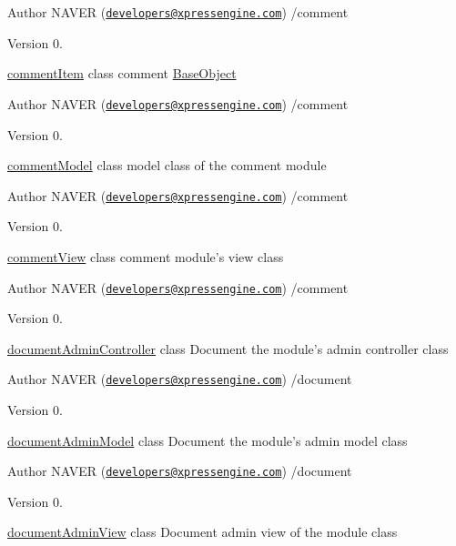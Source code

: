 \begin{DoxyAuthor}{Author}
N\-A\-V\-E\-R (\href{mailto:developers@xpressengine.com}{\tt developers@xpressengine.\-com}) /comment 
\end{DoxyAuthor}
\begin{DoxyVersion}{Version}
0.
\end{DoxyVersion}
\hyperlink{classcommentItem}{comment\-Item} class comment \hyperlink{classBaseObject}{Base\-Object}

\begin{DoxyAuthor}{Author}
N\-A\-V\-E\-R (\href{mailto:developers@xpressengine.com}{\tt developers@xpressengine.\-com}) /comment 
\end{DoxyAuthor}
\begin{DoxyVersion}{Version}
0.
\end{DoxyVersion}
\hyperlink{classcommentModel}{comment\-Model} class model class of the comment module

\begin{DoxyAuthor}{Author}
N\-A\-V\-E\-R (\href{mailto:developers@xpressengine.com}{\tt developers@xpressengine.\-com}) /comment 
\end{DoxyAuthor}
\begin{DoxyVersion}{Version}
0.
\end{DoxyVersion}
\hyperlink{classcommentView}{comment\-View} class comment module's view class

\begin{DoxyAuthor}{Author}
N\-A\-V\-E\-R (\href{mailto:developers@xpressengine.com}{\tt developers@xpressengine.\-com}) /comment 
\end{DoxyAuthor}
\begin{DoxyVersion}{Version}
0.
\end{DoxyVersion}
\hyperlink{classdocumentAdminController}{document\-Admin\-Controller} class Document the module's admin controller class

\begin{DoxyAuthor}{Author}
N\-A\-V\-E\-R (\href{mailto:developers@xpressengine.com}{\tt developers@xpressengine.\-com}) /document 
\end{DoxyAuthor}
\begin{DoxyVersion}{Version}
0.
\end{DoxyVersion}
\hyperlink{classdocumentAdminModel}{document\-Admin\-Model} class Document the module's admin model class

\begin{DoxyAuthor}{Author}
N\-A\-V\-E\-R (\href{mailto:developers@xpressengine.com}{\tt developers@xpressengine.\-com}) /document 
\end{DoxyAuthor}
\begin{DoxyVersion}{Version}
0.
\end{DoxyVersion}
\hyperlink{classdocumentAdminView}{document\-Admin\-View} class Document admin view of the module class

